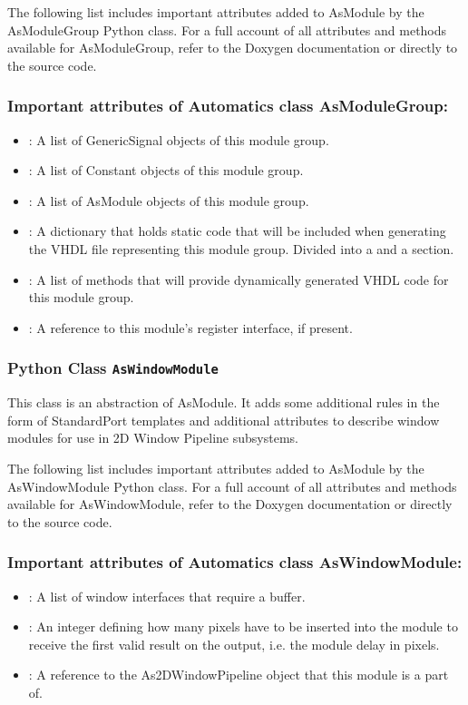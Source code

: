 The following list includes important attributes added to AsModule by the AsModuleGroup Python class.
For a full account of all attributes and methods available for AsModuleGroup, refer to the Doxygen documentation or directly to the source code.

\subsubsection*{Important attributes of Automatics class AsModuleGroup:}
\begin{itemize}
\item {}: A list of GenericSignal objects of this module group.
\item {}: A list of Constant objects of this module group.
\item {}: A list of AsModule objects of this module group.
\item {}: A dictionary that holds static code that will be included when generating the VHDL file representing this module group. Divided into a  and a  section.
\item {}: A list of methods that will provide dynamically generated VHDL code for this module group.
\item {}: A reference to this module's register interface, if present.
\end{itemize}


\subsubsection{Python Class \texttt{AsWindowModule}}

This class is an abstraction of AsModule.
It adds some additional rules in the form of StandardPort templates and additional attributes to describe window modules for use in 2D Window Pipeline subsystems.


The following list includes important attributes added to AsModule by the AsWindowModule Python class.
For a full account of all attributes and methods available for AsWindowModule, refer to the Doxygen documentation or directly to the source code.

\subsubsection*{Important attributes of Automatics class AsWindowModule:}
\begin{itemize}
\item {}: A list of window interfaces that require a buffer.
\item {}: An integer defining how many pixels have to be inserted into the module to receive the first valid result on the output, i.e. the module delay in pixels.
\item {}: A reference to the As2DWindowPipeline object that this module is a part of.
\end{itemize}


